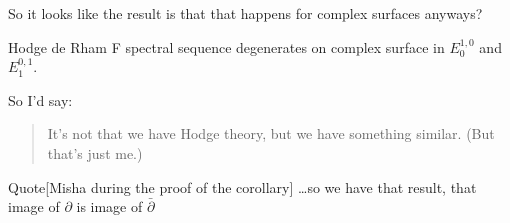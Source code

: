 So it looks like the result is that that happens for complex surfaces anyways?

\begin{coro}\leavevmode
Hodge de Rham F spectral sequence degenerates on complex surface in \(E^{1,0}_0\) and \(E^{0,1}_1\).
\end{coro}

So I'd say:
\begin{quotation}
	It's not that we have Hodge theory, but we have something similar. (But that's just me.)
\end{quotation}

\begin{thing4}{Quote}[Misha during the proof of the corollary]\leavevmode
…so we have that result, that image of \(\partial \) is image of \(\bar\partial\)
\end{thing4}

%


